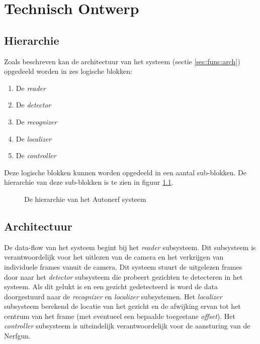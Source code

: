 \chapter{Technisch Ontwerp}
\label{ch:technical}

\section{Hierarchie}

Zoals beschreven kan de architectuur van het systeem (sectie \ref{sec:func:arch})
opgedeeld worden in zes logische blokken:

\begin{enumerate}
    \item De \emph{reader}
    \item De \emph{detector}
    \item De \emph{recognizer}
    \item De \emph{localizer}
    \item De \emph{controller}
\end{enumerate}

Deze logische blokken kunnen worden opgedeeld in een aantal sub-blokken. De
hierarchie van deze sub-blokken is te zien in figuur \ref{fig:hierarchy}.

\begin{figure}[H]
        
    \caption{De hierarchie van het Autonerf systeem}
    \label{fig:hierarchy}
\end{figure}

\section{Architectuur}
\label{sec:arch}

De data-flow van het systeem begint bij het \emph{reader} subsysteem. Dit subsysteem
is verantwoordelijk voor het uitlezen van de camera en het verkrijgen van individuele
frames vanuit de camera. Dit systeem stuurt de uitgelezen frames door naar het
\emph{detector} subsysteem die probeert gezichten te detecteren in het systeem.
Als dit gelukt is en een gezicht gedetecteerd is word de data doorgestuurd naar
de \emph{recognizer} en \emph{localizer} subsystemen. Het \emph{localizer}
subsysteem berekend de locatie van het gezicht en de afwijking ervan tot het
centrum van het frame (met eventueel een bepaalde toegestane \emph{offset}).
Het \emph{controller} subsysteem is uiteindelijk verantwoordelijk voor de
aansturing van de Nerfgun.


